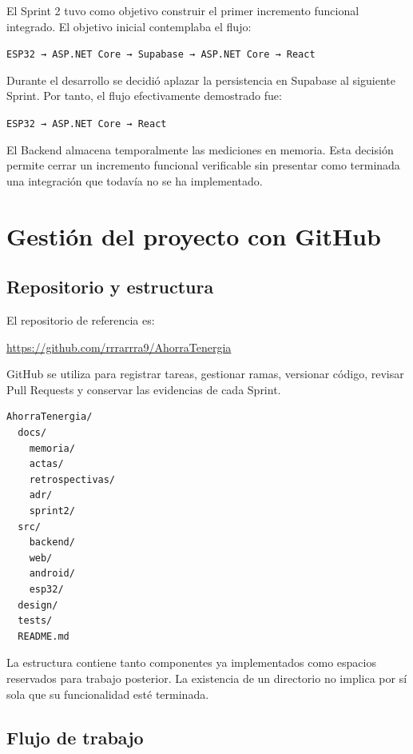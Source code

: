 \documentclass[11pt,a4paper,oneside]{report}
\begin{document}
El Sprint 2 tuvo como objetivo construir el primer incremento funcional integrado. El objetivo inicial contemplaba el flujo:

\begin{center}
\texttt{ESP32 → ASP.NET Core → Supabase → ASP.NET Core → React}
\end{center}

Durante el desarrollo se decidió aplazar la persistencia en Supabase al siguiente Sprint. Por tanto, el flujo efectivamente demostrado fue:

\begin{center}
\texttt{ESP32 → ASP.NET Core → React}
\end{center}

El Backend almacena temporalmente las mediciones en memoria. Esta decisión permite cerrar un incremento funcional verificable sin presentar como terminada una integración que todavía no se ha implementado.


\chapter{Gestión del proyecto con GitHub}

\section{Repositorio y estructura}

El repositorio de referencia es:

\url{https://github.com/rrrarrra9/AhorraTenergia}

GitHub se utiliza para registrar tareas, gestionar ramas, versionar código, revisar Pull Requests y conservar las evidencias de cada Sprint.

\begin{verbatim}
AhorraTenergia/
  docs/
    memoria/
    actas/
    retrospectivas/
    adr/
    sprint2/
  src/
    backend/
    web/
    android/
    esp32/
  design/
  tests/
  README.md
\end{verbatim}

La estructura contiene tanto componentes ya implementados como espacios reservados para trabajo posterior. La existencia de un directorio no implica por sí sola que su funcionalidad esté terminada.

\section{Flujo de trabajo}
\end{document}
